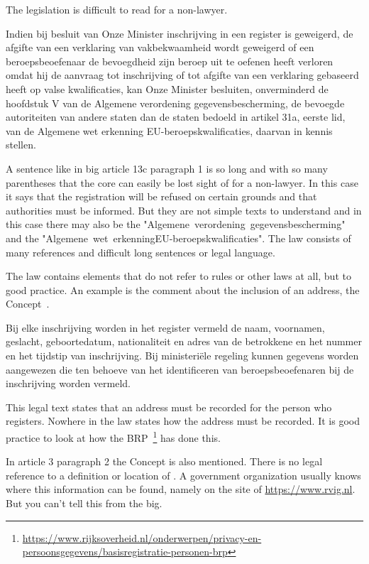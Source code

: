 The legislation is difficult to read for a non-lawyer.
\begin{tcolorbox} [title=\acrlong{big} artikel 13c lid1]
    Indien bij besluit van Onze Minister inschrijving in een register is geweigerd, de afgifte van een verklaring van vakbekwaamheid wordt geweigerd of een beroepsbeoefenaar de bevoegdheid zijn beroep uit te oefenen heeft verloren omdat hij de aanvraag tot inschrijving of tot afgifte van een verklaring gebaseerd heeft op valse kwalificaties, kan Onze Minister besluiten, onverminderd de hoofdstuk V van de Algemene verordening gegevensbescherming, de bevoegde autoriteiten van andere staten dan de staten bedoeld in artikel 31a, eerste lid, van de Algemene wet erkenning EU-beroepskwalificaties, daarvan in kennis stellen.
\end{tcolorbox}
A sentence like in \acrlong{big} article 13c paragraph 1 is so long and with so many parentheses that the core can easily be lost sight of for a non-lawyer.
In this case it says that the registration will be refused on certain grounds and that authorities must be informed.
But they are not simple texts to understand and in this case there may also be the \mbox{"Algemene verordening gegevensbescherming"} and the \mbox{"Algemene wet erkenningEU-beroepskwalificaties"}.
The law consists of many references and difficult long sentences or legal language.

The law contains elements that do not refer to rules or other laws at all, but to good practice.
An example is the comment about the inclusion of an address, the Concept~.
\begin{tcolorbox} [title=artikel 3 lid 2, label=art3lid2 ]
    Bij elke inschrijving worden in het register vermeld de naam, voornamen, geslacht, geboortedatum, nationaliteit en adres van de betrokkene en het nummer en het tijdstip van inschrijving. Bij ministeriële regeling kunnen gegevens worden aangewezen die ten behoeve van het identificeren van beroepsbeoefenaren bij de inschrijving worden vermeld.
\end{tcolorbox}
This legal text states that an address must be recorded for the person who registers.
Nowhere in the law states how the address must be recorded.
It is good practice to look at how the BRP~\footnote{\url{https://www.rijksoverheid.nl/onderwerpen/privacy-en-persoonsgegevens/basisregistratie-personen-brp}} has done this.

In article 3 paragraph 2 the Concept  is also mentioned.
There is no legal reference to a definition or location of .
A government organization usually knows where this information can be found, namely on the site of \url{https://www.rvig.nl}.
But you can't tell this from the \acrshort{big}.

